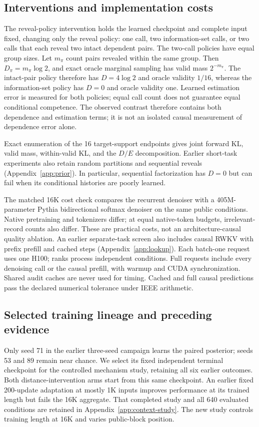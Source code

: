 \documentclass{article}
\begin{document}


\subsection{Interventions and implementation costs}
The reveal-policy intervention holds the learned checkpoint and complete input fixed,
changing only the reveal policy: one call, two information-set calls, or two
calls that each reveal two intact dependent pairs. The two-call policies have
equal group sizes. Let $m_\pi$ count pairs revealed within the same group.
Then $D_\pi=m_\pi\log2$, and exact oracle marginal sampling has valid mass
$2^{-m_\pi}$. The intact-pair policy therefore has $D=4\log2$ and oracle
validity $1/16$, whereas the information-set policy has $D=0$ and oracle
validity one. Learned estimation error is measured for both policies; equal
call count does not guarantee equal conditional competence. The observed
contrast therefore contains both dependence and estimation terms; it is not
an isolated causal measurement of dependence error alone.

Exact enumeration of the 16 target-support endpoints gives joint forward KL,
valid mass, within-valid KL, and the $D/E$ decomposition. Earlier short-task
experiments also retain random partitions and sequential reveals
(Appendix~\ref{app:prior}). In particular, sequential factorization has $D=0$
but can fail when its conditional histories are poorly learned.

The matched 16K cost check compares the recurrent denoiser with a
405M-parameter Pythia bidirectional softmax denoiser on the same public
conditions. Native pretraining and tokenizers differ; at equal native-token
budgets, irrelevant-record counts also differ. These are practical costs,
not an architecture-causal quality ablation. An earlier separate-task screen
also includes causal RWKV with prefix prefill and cached steps
(Appendix~\ref{app:lookup}). Each batch-one request uses one H100; ranks
process independent conditions. Full requests include every
denoising call or the causal prefill, with warmup and CUDA synchronization.
Shared audit caches are never used for timing. Cached and full causal
predictions pass the declared numerical tolerance under IEEE arithmetic.

\subsection{Selected training lineage and preceding evidence}
Only seed 71 in the earlier three-seed campaign learns the paired posterior;
seeds 53 and 89 remain near chance. We select its fixed independent terminal
checkpoint for the controlled mechanism study, retaining all six earlier
outcomes. Both distance-intervention arms start from this same checkpoint.
An earlier fixed 200-update adaptation at mostly 1K inputs improves performance
at its trained length but fails the 16K aggregate. That completed study and all
640 evaluated conditions are retained in Appendix~\ref{app:context-study}.
The new study controls training length at 16K and varies public-block position.
\end{document}
